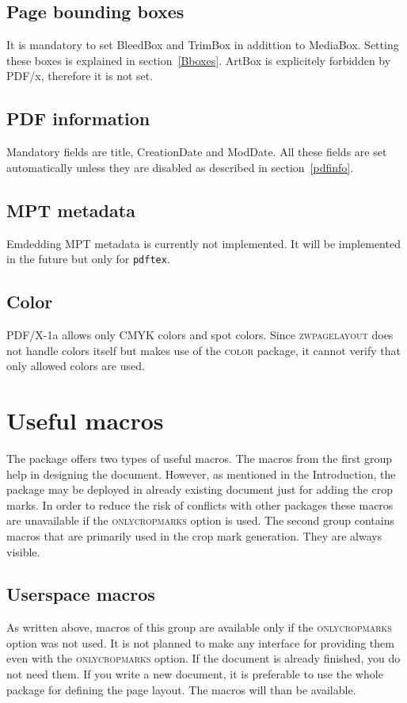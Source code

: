\documentclass[11pt]{article}
\def\opt#1{\texorpdfstring{\textmd{\textsc{#1}}}{#1}}
\let\pkg\textsc
\begin{document}
\subsection{Page bounding boxes}
It is mandatory to set BleedBox and TrimBox in addittion to MediaBox. Setting these boxes
is explained in section~\ref{Bboxes}. ArtBox is explicitely forbidden by PDF/x, therefore it is not
set.

\subsection{PDF information}
Mandatory fields are title, CreationDate and ModDate. All these fields are set automatically unless
they are disabled as described in section~\ref{pdfinfo}.

\subsection{MPT metadata}
Emdedding MPT metadata is currently not implemented. It will be implemented in the future but only
for \texttt{pdftex}.

\subsection{Color}
PDF/X-1a allows only CMYK colors and spot colors. Since \pkg{zwpagelayout} does not handle colors
itself but makes use of the \pkg{color} package, it cannot verify that only allowed colors are
used.


\section{Useful macros}\label{macros}
The package offers two types of useful macros. The macros from the first group help in designing
the document. However, as mentioned in the Introduction, the package may be deployed in already
existing document just for adding the crop marks. In order to reduce the risk of conflicts with
other packages these macros are unavailable if the \opt{onlycropmarks} option is used. The second
group contains macros that are primarily used in the crop mark generation. They are always visible.

\subsection{Userspace macros}\label{user.macros}
As written above, macros of this group are available only if the \opt{onlycropmarks} option was not
used. It is not planned to make any interface for providing them even with the \opt{onlycropmarks}
option. If the document is already finished, you do not need them. If you write a new document, it
is preferable to use the whole package for defining the page layout. The macros will than be
available.
\end{document}
